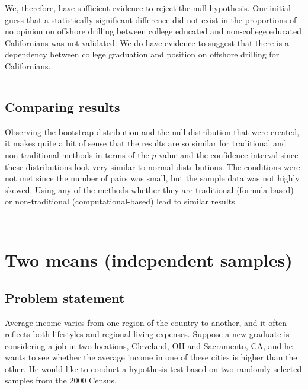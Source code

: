 \documentclass[12pt,]{krantz}
\theoremstyle{definition}
\theoremstyle{definition}
\theoremstyle{definition}
\theoremstyle{remark}
\begin{document}
We, therefore, have sufficient evidence to reject the null hypothesis.
Our initial guess that a statistically significant difference did not
exist in the proportions of no opinion on offshore drilling between
college educated and non-college educated Californians was not
validated. We do have evidence to suggest that there is a dependency
between college graduation and position on offshore drilling for
Californians.

\begin{center}\rule{0.5\linewidth}{\linethickness}\end{center}

\subsection{Comparing results}\label{comparing-results-2}

Observing the bootstrap distribution and the null distribution that were
created, it makes quite a bit of sense that the results are so similar
for traditional and non-traditional methods in terms of the \(p\)-value
and the confidence interval since these distributions look very similar
to normal distributions. The conditions were not met since the number of
pairs was small, but the sample data was not highly skewed. Using any of
the methods whether they are traditional (formula-based) or
non-traditional (computational-based) lead to similar results.

\begin{center}\rule{0.5\linewidth}{\linethickness}\end{center}

\begin{center}\rule{0.5\linewidth}{\linethickness}\end{center}

\section{Two means (independent
samples)}\label{two-means-independent-samples}

\subsection{Problem statement}\label{problem-statement-3}

Average income varies from one region of the country to another, and it
often reflects both lifestyles and regional living expenses. Suppose a
new graduate is considering a job in two locations, Cleveland, OH and
Sacramento, CA, and he wants to see whether the average income in one of
these cities is higher than the other. He would like to conduct a
hypothesis test based on two randomly selected samples from the 2000
Census. \citep[Tweaked a bit from][ {[}Chapter 5{]}]{isrs2014}
\end{document}
